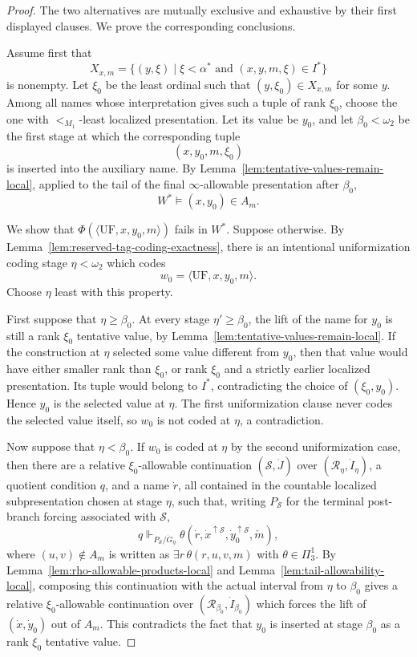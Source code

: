 \documentclass[a4paper,11pt]{article}
\begin{document}
\begin{proof}
The two alternatives are mutually exclusive and exhaustive by their first displayed clauses.  We prove the corresponding conclusions.

Assume first that
\[
   X_{x,m}=\{(y,\xi)\mid \xi<\alpha^\ast\text{ and }(x,y,m,\xi)\in I^\ast\}
\]
is nonempty.  Let \(\xi_0\) be the least ordinal such that \((y,\xi_0)\in X_{x,m}\) for some \(y\).  Among all names whose interpretation gives such a tuple of rank \(\xi_0\), choose the one with \(<_{M_1}\)-least localized presentation.  Let its value be \(y_0\), and let \(\beta_0<\omega_2\) be the first stage at which the corresponding tuple
\[
   (x,y_0,m,\xi_0)
\]
is inserted into the auxiliary name.  By Lemma~\ref{lem:tentative-values-remain-local}, applied to the tail of the final \(\infty\)-allowable presentation after \(\beta_0\),
\[
   W^\ast\models (x,y_0)\in A_m.        \tag{1}
\]

We show that \(\Phi(\langle\mathrm{UF},x,y_0,m\rangle)\) fails in \(W^\ast\).  Suppose otherwise.  By Lemma~\ref{lem:reserved-tag-coding-exactness}, there is an intentional uniformization coding stage \(\eta<\omega_2\) which codes
\[
   w_0=\langle\mathrm{UF},x,y_0,m\rangle .
\]
Choose \(\eta\) least with this property.

First suppose that \(\eta\geq\beta_0\).  At every stage \(\eta'\geq\beta_0\), the lift of the name for \(y_0\) is still a rank \(\xi_0\) tentative value, by Lemma~\ref{lem:tentative-values-remain-local}.  If the construction at \(\eta\) selected some value different from \(y_0\), then that value would have either smaller rank than \(\xi_0\), or rank \(\xi_0\) and a strictly earlier localized presentation.  Its tuple would belong to \(I^\ast\), contradicting the choice of \((\xi_0,y_0)\).  Hence \(y_0\) is the selected value at \(\eta\).  The first uniformization clause never codes the selected value itself, so \(w_0\) is not coded at \(\eta\), a contradiction.

Now suppose that \(\eta<\beta_0\).  If \(w_0\) is coded at \(\eta\) by the second uniformization case, then there are a relative \(\xi_0\)-allowable continuation \((\mathcal S,\dot J)\) over \((\mathcal R_\eta,\dot I_\eta)\), a quotient condition \(q\), and a name \(\dot r\), all contained in the countable localized subpresentation chosen at stage \(\eta\), such that, writing \(P_{\mathcal S}\) for the terminal post-branch forcing associated with \(\mathcal S\),
\[
   q\Vdash_{P_{\mathcal S}/\dot G_\eta}
      \theta(\dot r,
             \dot x^{\uparrow\mathcal S},
             \dot y_0^{\uparrow\mathcal S},
             \check m),
\]
where \((u,v)\notin A_m\) is written as \(\exists r\,\theta(r,u,v,m)\) with \(\theta\in\Pi^1_3\).  By Lemma~\ref{lem:rho-allowable-products-local} and Lemma~\ref{lem:tail-allowability-local}, composing this continuation with the actual interval from \(\eta\) to \(\beta_0\) gives a relative \(\xi_0\)-allowable continuation over \((\mathcal R_{\beta_0},\dot I_{\beta_0})\) which forces the lift of \((\dot x,\dot y_0)\) out of \(A_m\).  This contradicts the fact that \(y_0\) is inserted at stage \(\beta_0\) as a rank \(\xi_0\) tentative value.


\end{proof}
\end{document}
